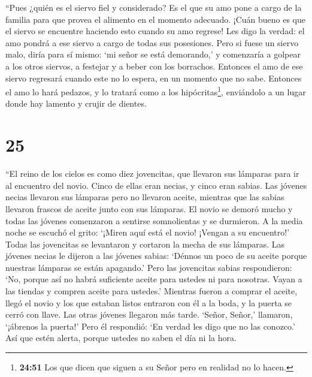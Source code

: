  ``Pues ¿quién es el siervo fiel y considerado? Es el que
su amo pone a cargo de la familia para que provea el alimento en el
momento adecuado.  ¡Cuán bueno es que el siervo se
encuentre haciendo esto cuando su amo regrese!  Les digo la
verdad: el amo pondrá a ese siervo a cargo de todas sus posesiones.
 Pero si fuese un siervo malo, diría para sí mismo: `mi
señor se está demorando,'  y comenzaría a golpear a los
otros siervos, a festejar y a beber con los borrachos. 
Entonces el amo de ese siervo regresará cuando este no lo espera, en un
momento que no sabe.  Entonces el amo lo hará pedazos, y lo
tratará como a los hipócritas\footnote{\textbf{24:51} Los que dicen que
  siguen a su Señor pero en realidad no lo hacen.}, enviándolo a un
lugar donde hay lamento y crujir de dientes.

\hypertarget{section-24}{%
\section{25}\label{section-24}}

 ``El reino de los cielos es como diez jovencitas, que
llevaron sus lámparas para ir al encuentro del novio.  Cinco
de ellas eran necias, y cinco eran sabias.  Las jóvenes
necias llevaron sus lámparas pero no llevaron aceite, 
mientras que las sabias llevaron frascos de aceite junto con sus
lámparas.  El novio se demoró mucho y todas las jóvenes
comenzaron a sentirse somnolientas y se durmieron.  A la
media noche se escuchó el grito: `¡Miren aquí está el novio! ¡Vengan a
su encuentro!'  Todas las jovencitas se levantaron y
cortaron la mecha de sus lámparas. Las jóvenes necias le dijeron a las
jóvenes sabias:  `Dénnos un poco de su aceite porque
nuestras lámparas se están apagando.' Pero las jovencitas sabias
respondieron:  `No, porque así no habrá suficiente aceite
para ustedes ni para nosotras. Vayan a las tiendas y compren aceite para
ustedes.'  Mientras fueron a comprar el aceite, llegó el
novio y los que estaban listos entraron con él a la boda, y la puerta se
cerró con llave.  Las otras jóvenes llegaron más tarde.
`Señor, Señor,' llamaron, `¡ábrenos la puerta!'  Pero él
respondió: `En verdad les digo que no las conozco.'  Así
que estén alerta, porque ustedes no saben el día ni la hora.

